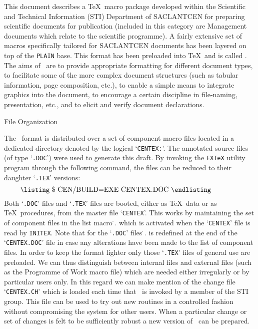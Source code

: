  
\privatize
{}
 
This document describes a \TeX\ macro package developed within the 
Scientific
and Technical Information (STI) Department of SACLANTCEN for preparing
scientific documents for publication (included in this category are 
Management
documents which relate to the scientific programme). 
\medskip
A fairly extensive set of macros specifically tailored for SACLANTCEN 
documents
has been layered on top of the {\tt PLAIN} base.  This format has been
preloaded into \TeX\ and is called \cen.  The aims of \cen\ are to provide
appropriate formatting for different document types, to facilitate some of 
the
more complex document structures (such as tabular information, page
composition, etc.), to enable a simple means to integrate graphics into the
document, to encourage a certain discipline in file-naming, presentation, 
etc.,
and to elicit and verify document declarations. 

\subhead
File Organization                                                   

The \cen\ format is distributed over a set of component macro files 
located in
a dedicated directory denoted by the logical `{\tt CENTEX:}'. The annotated
source files (of type `{\tt .DOC}') were used to generate this draft. By
invoking the {\tt EX\TeX} utility program through the following command, 
the
files can be reduced to their  daughter `{\tt .TEX}' versions:
$$
\vbox{\listing
\$ CEN/BUILD=EXE CENTEX.DOC
\endlisting}
$$
Both `{\tt .DOC}' files and `{\tt .TEX}' files are booted, either as \TeX\ 
data
or as \TeX\ procedures, from the master file `{\tt CENTEX}'. This works by
maintaining the set of component files in the list macro \.\cen@module@set.
which is activated when the `{\tt CENTEX}' file is read by {\tt INITEX}. 
Note
that for the `{\tt .DOC}' files \.\cen@module@set. is redefined at the end 
of
the `{\tt CENTEX.DOC}' file in case any alterations have been made to the 
list
of component files. 
\medskip
In order to keep the format lighter only those `{\tt .TEX}' files of 
general
use are preloaded.  We can thus distinguish between internal files and 
external
files (such as the Programme of Work macro file) which are needed either
irregularly or by particular users only. In this regard we can make mention
of the change file `{\tt CENTEX.CH}' which is loaded each time that \cen\ 
is invoked
by a member of the STI group. This file can be used to try out new routines
in a controlled fashion without compromising the system for other users.
When a particular change or set of changes is felt to be sufficiently 
robust
a new version of \cen\ can be prepared.

